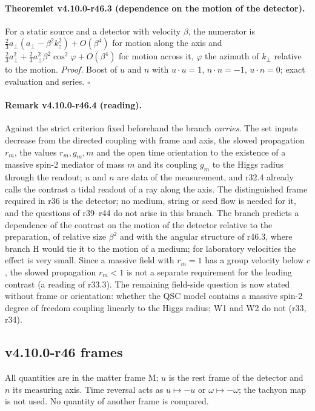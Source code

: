 \paragraph{Theoremlet v4.10.0-r46.3 (dependence on the motion of the detector).}
For a static source and a detector with velocity \(\beta\), the numerator is \(\tfrac23a_\perp(a_\perp-\beta^2k_z^2)+O(\beta^4)\) for motion along the axis and
\(\tfrac23a_\perp^2+\tfrac23a_\perp^2\beta^2\cos^2\varphi+O(\beta^4)\) for motion across it, \(\varphi\) the azimuth of \(k_\perp\) relative to the motion.
\emph{Proof.} Boost of \(u\) and \(n\) with \(u\cdot u=1\), \(n\cdot n=-1\), \(u\cdot n=0\); exact evaluation and series.  \(\square\)

\paragraph{Remark v4.10.0-r46.4 (reading).}
Against the strict criterion fixed beforehand the branch \emph{carries}.  The set inputs decrease from the directed coupling with frame and axis, the
slowed propagation \(r_m\), the values \(r_m,g_m,m\) and the open time orientation to the existence of a massive spin-2 mediator of mass \(m\) and its coupling
\(g_m\) to the Higgs radius through the readout; \(u\) and \(n\) are data of the measurement, and r32.4 already calls the contrast a tidal readout of a ray along
the axis.  The distinguished frame required in r36 is the detector; no medium, string or seed flow is needed for it, and the questions of r39--r44
do not arise in this branch.  The branch predicts a dependence of the contrast on the motion of the detector relative to the preparation, of relative
size \(\beta^2\) and with the angular structure of r46.3, where branch H would tie it to the motion of a medium; for laboratory velocities the effect is
very small.  Since a massive field with \(r_m=1\) has a group velocity below \(c\), the slowed propagation \(r_m<1\) is not a separate requirement for the leading
contrast (a reading of r33.3).  The remaining field-side question is now stated without frame or orientation: whether the QSC model contains a
massive spin-2 degree of freedom coupling linearly to the Higgs radius; W1 and W2 do not (r33, r34).

\subsection*{v4.10.0-r46 frames}
\label{subsec:v4100-r46-frames}

All quantities are in the matter frame M; \(u\) is the rest frame of the detector and \(n\) its measuring axis.  Time reversal acts as \(u\mapsto-u\) or \(\omega\mapsto-\omega\); the
tachyon map is not used.  No quantity of another frame is compared.

